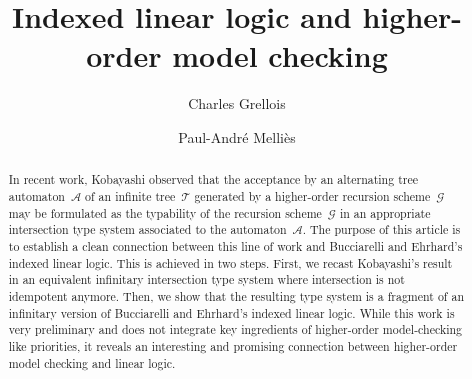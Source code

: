 \documentclass{eptcs}
\begin{document}
\title{Indexed linear logic and higher-order model checking}
\author{Charles Grellois
 \and Paul-Andr\'e Melli\`es
}
\def\titlerunning{Indexed linear logic and higher-order model-checking}
\def\authorrunning{C. Grellois and P.-A. Melli\`es}
\maketitle
\begin{abstract}
In recent work, Kobayashi observed
that the acceptance by an alternating tree automaton~$\mathcal{A}$
of an infinite tree~$\mathcal{T}$ generated by a higher-order recursion scheme~$\mathcal{G}$
may be formulated as the typability of the recursion scheme~$\mathcal{G}$
in an appropriate intersection type system associated to the automaton~$\mathcal{A}$.
The purpose of this article is to establish a clean connection between
this line of work and Bucciarelli and Ehrhard's indexed linear logic.
This is achieved in two steps.
First, we recast Kobayashi's result in an equivalent infinitary intersection type system
where intersection is not idempotent anymore.
Then, we show that the resulting type system is a fragment of an infinitary version 
of Bucciarelli and Ehrhard's indexed linear logic.
While this work is very preliminary and does not integrate
key ingredients of higher-order model-checking like priorities,
it reveals an interesting and promising connection between higher-order model checking
and linear logic.
\end{abstract}
\end{document}
